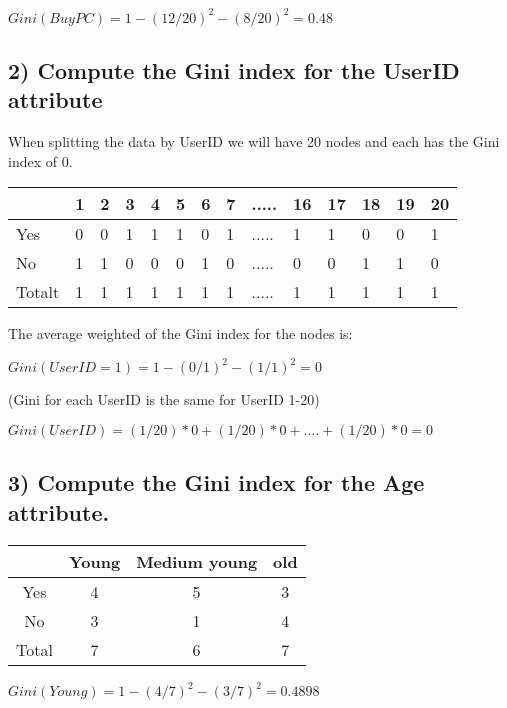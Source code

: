		$Gini(Buy PC) = 1 - (12/20)^{2} - (8/20)^{2} = 0.48$

		\clearpage
		\subsection*{2) Compute the Gini index for the UserID attribute}

		When splitting the data by UserID we will have 20 nodes and each 
		has the Gini index of 0. 

		\begin{table}[H]
			\begin{tabular}{ l | l | l | l | l | l | l | l | l | l | l |l | l | l }
				 & 1 & 2 & 3 & 4 & 5 & 6 & 7 & ..... & 16 & 17 & 18 & 19 & 20  \\ \hline
				Yes & 0 & 0 & 1 & 1 & 1 & 0 & 1 & ..... & 1 & 1 & 0 & 0 & 1  \\ \hline 
				No & 1 & 1 & 0 & 0 & 0 & 1 & 0 & ..... & 0 & 0 & 1 & 1 & 0  \\ \hline
				Totalt & 1 & 1 & 1 & 1 & 1 & 1 & 1 & ..... & 1 & 1 & 1 & 1 & 1 \\
			\end{tabular}
		\end{table}

		The average weighted of the Gini index for the nodes is:

		$ Gini(UserID = 1) = 1 - (0/1)^{2} - (1/1)^{2} = 0 $

		(Gini for each UserID is the same for UserID 1-20)

		$ Gini(UserID) = (1/20)*0 + (1/20)*0 + .... + (1/20)*0 = 0 $



		\subsection*{3) Compute the Gini index for the Age attribute.}

		\begin{table}[H]
			\begin{tabular}{ c | c | c | c  }
				 & Young & Medium young & old  \\ \hline
				Yes & 4 & 5 & 3 \\ \hline
				No & 3 & 1 & 4 \\ \hline
				Total & 7 & 6 & 7 \\
			\end{tabular}
		\end{table}

		$Gini(Young) = 1 - (4/7)^{2} - (3/7)^{2} = 0.4898$

